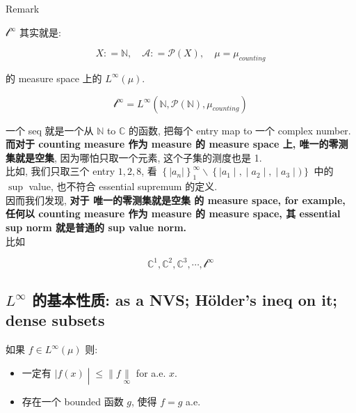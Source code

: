 \begin{qlremark}{Remark}

\(\mathcal{l}^{\infty}\) 其实就是:

\[X: = \mathbb{N},\quad\mathcal{A}: = \mathcal{P}(X),\quad\mu = \mu_{counting}\]

的 measure space 上的 \(L^{\infty}(\mu)\).

\[\mathcal{l}^{\infty} = L^{\infty}(\mathbb{N},\mathcal{P}(\mathbb{N}),\mu_{counting})\]

一个 seq 就是一个从 \(\mathbb{N}\) to \(\mathbb{C}\) 的函数, 把每个 entry map to 一个 complex number.\\
\textbf{而对于 counting measure 作为 measure 的 measure space 上, 唯一的零测集就是空集}, 因为哪怕只取一个元素, 这个子集的测度也是 1.\\
比如, 我们只取三个 entry \(1,2,8\), 看 \(\left\{ {|a_{n}|} \right\}_{1}^{\infty}\backslash\left\{ |a_{1} \middle| , \middle| a_{2} \middle| , \middle| a_{3} \middle| ) \right\}\) 中的 \(\sup\) value, 也不符合 essential supremum 的定义.\\
因而我们发现, \textbf{对于 唯一的零测集就是空集 的 measure space, for example, 任何以 counting measure 作为 measure 的 measure space, 其 essential sup norm 就是普通的 sup value norm.}\\
比如

\[\mathbb{C}^{1},\mathbb{C}^{2},\mathbb{C}^{3},\cdots,\mathcal{l}^{\infty}\]

\end{qlremark}

\subsection{\texorpdfstring{\(L^{\infty}\) 的基本性质: as a NVS; Hölder's ineq on it; dense subsets}{L\^{}\{\textbackslash infty\} 的基本性质: as a NVS; Hölder's ineq on it; dense subsets}}\label{linfty-ux7684ux57faux672cux6027ux8d28-as-a-nvs-huxf6lders-ineq-on-it-dense-subsets}

\begin{lemma}

如果 \(f \in L^{\infty}(\mu)\) 则:

\begin{itemize}
\item
  一定有 \(\left. |f(x) \middle| \leq \parallel f\underset{\infty}{\parallel} \right.\) for a.e. \(x\).
\item
  存在一个 bounded 函数 \(g\), 使得 \(f = g\) a.e.
\end{itemize}

\end{lemma}

